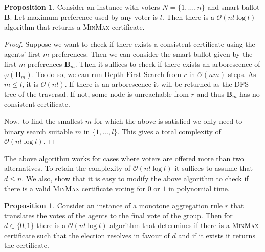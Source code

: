 \documentclass[11pt,a4paper, titlepage]{article}
\theoremstyle{definition}
\newtheorem{proposition}[theorem]{Proposition}
\let\vec\mathbf
\begin{document}
\begin{proposition}
    Consider an instance with voters $N = \{1, \ldots, n\}$ and smart ballot $\vec{B}$. 
    Let maximum preference used by any voter is $l$.
    Then there is a $\mathcal{O}(nl \log l)$ algorithm that returns a \textsc{MinMax} certificate.
\end{proposition}

\begin{proof}
    Suppose we want to check if there exists a consistent certificate using the agents' first $m$ preferences. Then we can consider the smart ballot given by the first $m$ preferences $\vec{B}_m$.
    Then it suffices to check if there exists an arborescence of $\varphi(\vec{B}_m)$.
    To do so, we can run Depth First Search from $r$ in $\mathcal{O}(nm)$ steps. As $m \leq l$, it is $\mathcal{O}(nl)$.
    If there is an arborescence it will be returned as the DFS tree of the traversal. If not, some node is unreachable from $r$ and thus $\vec{B}_m$ has no consistent certificate.

    Now, to find the smallest $m$ for which the above is satisfied we only need to binary search suitable $m$ in $\{1, \ldots, l\}$.
    This gives a total complexity of $\mathcal{O}(nl \log l)$.

\end{proof}

The above algorithm works for cases where voters are offered more than two alternatives.
To retain the complexity of $\mathcal{O}(nl \log l)$ it suffices to assume that $d \leq n$.
We also, show that it is easy to modify the above algorithm to check if there is a valid \textsc{MinMax} certificate voting for $0$ or $1$ in polynomial time.


\begin{proposition}
    Consider an instance of a monotone aggregation rule $r$ that translates the votes of the agents to the final vote of the group. 
    Then for $d \in \{0, 1\}$ there is a $\mathcal{O}(nl \log l)$ algorithm that determines if there is a \textsc{MinMax} certificate such that the election resolves in favour of $d$ and if it exists it returns the certificate.
\end{proposition}
\end{document}
